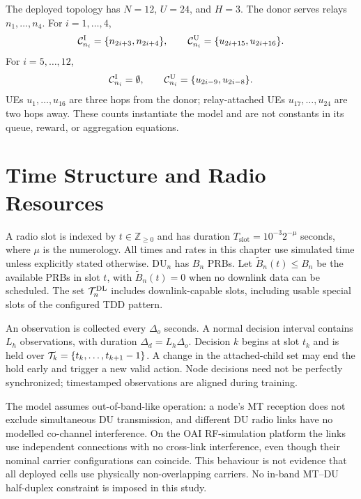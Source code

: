 \begin{EnChapter}
\begin{example}
The deployed topology has $N=12$, $U=24$, and $H=3$. The donor serves relays
$n_1,\ldots,n_4$. For $i=1,\ldots,4$,
\begin{equation}
  \mathcal{C}_{n_i}^{\mathrm{I}}=\{n_{2i+3},n_{2i+4}\},\qquad
  \mathcal{C}_{n_i}^{\mathrm{U}}=\{u_{2i+15},u_{2i+16}\}.
\end{equation}
For $i=5,\ldots,12$,
\begin{equation}
  \mathcal{C}_{n_i}^{\mathrm{I}}=\emptyset,\qquad
  \mathcal{C}_{n_i}^{\mathrm{U}}=\{u_{2i-9},u_{2i-8}\}.
\end{equation}
UEs $u_1,\ldots,u_{16}$ are three hops from the donor; relay-attached UEs
$u_{17},\ldots,u_{24}$ are two hops away. These counts instantiate the model and
are not constants in its queue, reward, or aggregation equations.
\end{example}

\section{Time Structure and Radio Resources}
\label{subsec:resource}

A radio slot is indexed by $t\in\mathbb{Z}_{\ge0}$ and has duration
$T_{\mathrm{slot}}=10^{-3}2^{-\mu}$ seconds, where $\mu$ is the numerology.
All times and rates in this chapter use simulated time unless explicitly stated
otherwise. DU$_n$ has $B_n$ PRBs. Let $\tilde B_n(t)\le B_n$ be the available
PRBs in slot $t$, with $\tilde B_n(t)=0$ when no downlink data can be scheduled.
The set $\mathcal{T}_n^{\mathrm{DL}}$ includes downlink-capable slots, including usable
special slots of the configured TDD pattern.

An observation is collected every $\Delta_o$ seconds. A normal decision interval
contains $L_h$ observations, with duration $\Delta_d=L_h\Delta_o$. Decision $k$
begins at slot $t_k$ and is held over $\mathcal{T}_k=\{t_k,\ldots,t_{k+1}-1\}$.
A change in the attached-child set may end the hold early and trigger a new
valid action. Node decisions need not be perfectly synchronized; timestamped
observations are aligned during training.

\begin{assumption}
\label{ass:orthogonal}
The model assumes out-of-band-like operation: a node's MT reception does not
exclude simultaneous DU transmission, and different DU radio links have no
modelled co-channel interference. On the OAI RF-simulation platform the links use
independent connections with no cross-link interference, even though their
nominal carrier configurations can coincide. This behaviour is not evidence that
all deployed cells use physically non-overlapping carriers. No in-band MT--DU
half-duplex constraint is imposed in this study.
\end{assumption}


\end{EnChapter}
